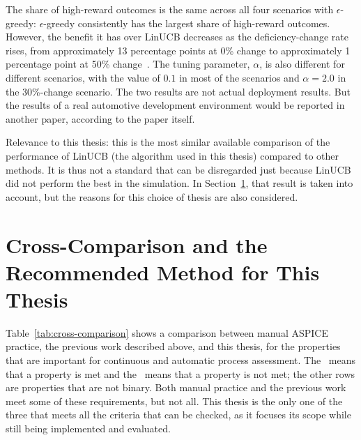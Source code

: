 \documentclass[a4paper, 12pt, oneside, openany, BCOR1cm,toc=chapterentrywithdots]{scrbook}
\newcommand{\cmark}{\textcolor{green!45!black}{\ding{51}}}
\newcommand{\xmark}{\textcolor{red!60!black}{\ding{55}}}
\begin{document}
The share of high-reward outcomes is the same across all four scenarios with $\epsilon$-greedy:
$\epsilon$-greedy consistently has the largest share of high-reward outcomes. However, the
benefit it has over LinUCB decreases as the deficiency-change rate rises, from approximately 13
percentage points at 0\% change to approximately 1 percentage point at 50\%
change~\cite{datsogiannis2025recommender}. The tuning parameter, $\alpha$, is also different for
different scenarios, with the value of $0.1$ in most of the scenarios and $\alpha = 2.0$ in the
30\%-change scenario. The two results are not actual deployment results. But the results of a
real automotive development environment would be reported in another paper, according to the
paper itself.

Relevance to this thesis: this is the most similar available comparison of the
performance of LinUCB (the algorithm used in this thesis) compared to other methods. It is thus
not a standard that can be disregarded just because LinUCB did not perform the best in the
simulation. In Section~\ref{sec:cross-comparison}, that result is taken into account, but the
reasons for this choice of thesis are also considered.

\section{Cross-Comparison and the Recommended Method for This Thesis}
\label{sec:cross-comparison}

Table~\ref{tab:cross-comparison} shows a comparison between manual ASPICE practice, the previous
work described above, and this thesis, for the properties that are important for continuous and
automatic process assessment. The \cmark\ means that a property is met and the \xmark\ means
that a property is not met; the other rows are properties that are not binary. Both manual
practice and the previous work meet some of these requirements, but not all. This thesis is the
only one of the three that meets all the criteria that can be checked, as it focuses its scope
while still being implemented and evaluated.
\end{document}
